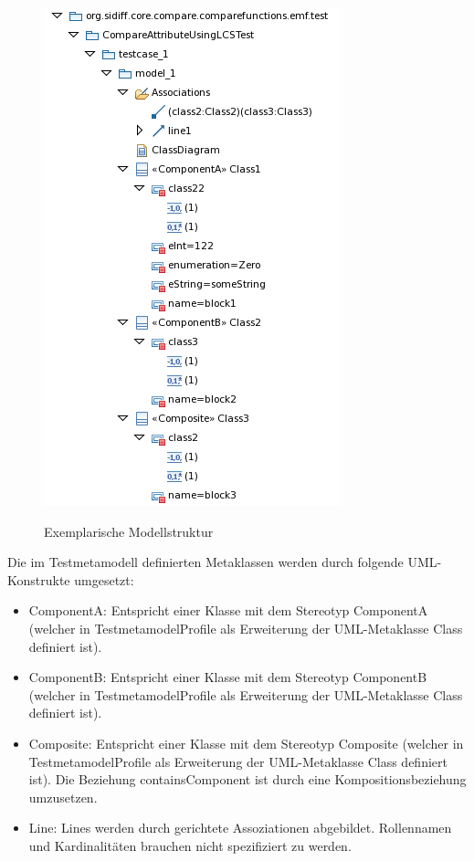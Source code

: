 \begin{figure}
	\centering
 	\includegraphics[scale=0.8]{img/sample-instance-structure.png}
	\label{img:sample-instance-structure}
	\caption{Exemplarische Modellstruktur}
\end{figure}

Die im Testmetamodell definierten Metaklassen werden durch folgende UML-Konstrukte umgesetzt:
\begin{itemize}
 \item ComponentA: Entspricht einer Klasse mit dem Stereotyp ComponentA (welcher in TestmetamodelProfile als Erweiterung der UML-Metaklasse Class definiert ist).
 \item ComponentB: Entspricht einer Klasse mit dem Stereotyp ComponentB (welcher in TestmetamodelProfile als Erweiterung der UML-Metaklasse Class definiert ist).
 \item Composite: Entspricht einer Klasse mit dem Stereotyp Composite (welcher in TestmetamodelProfile als Erweiterung der UML-Metaklasse Class definiert ist). Die Beziehung containsComponent ist durch eine Kompositionsbeziehung umzusetzen.
 \item Line: Lines werden durch gerichtete Assoziationen abgebildet. Rollennamen und Kardinalitäten brauchen nicht spezifiziert zu werden.
\end{itemize}

